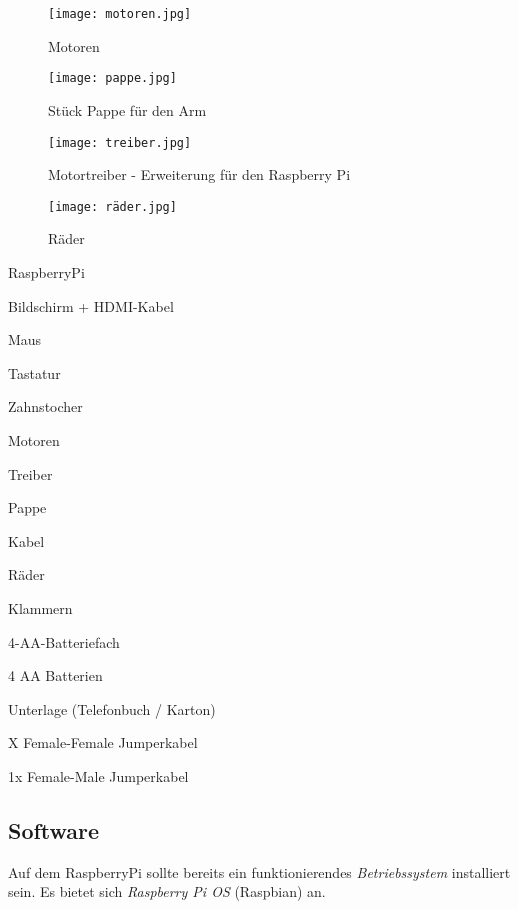 
\begin{figure}[h]
\centering
\parbox{5cm}{
\texttt{[image: motoren.jpg]}
\caption*{Motoren}
}
\qquad
\begin{minipage}{5cm}
\texttt{[image: pappe.jpg]}
\caption*{Stück Pappe für den Arm}
\end{minipage}
\end{figure}


\begin{figure}[h]
\centering
\parbox{5cm}{
\texttt{[image: treiber.jpg]}
\caption*{Motortreiber - Erweiterung für den Raspberry Pi}
}
\qquad
\begin{minipage}{5cm}
\texttt{[image: räder.jpg]}
\caption*{Räder}
\end{minipage}
\end{figure}



\begin{checklist}
    \item RaspberryPi
    \item Bildschirm + HDMI-Kabel
    \item Maus
    \item Tastatur
    \item Zahnstocher
    \item Motoren
    \item Treiber
    \item Pappe
    \item Kabel
    \item Räder
    \item Klammern
    \item 4-AA-Batteriefach
    \item 4 AA Batterien
    \item Unterlage (Telefonbuch / Karton)
    \item X Female-Female Jumperkabel
    \item 1x Female-Male Jumperkabel
\end{checklist}


\subsection{Software}
Auf dem RaspberryPi sollte bereits ein funktionierendes \emph{Betriebssystem} installiert sein. Es bietet sich \emph{Raspberry Pi OS} (Raspbian) an. \\

